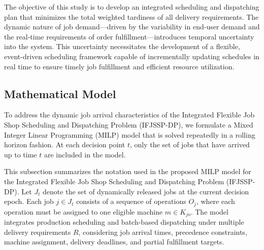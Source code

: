 \documentclass{article}
\begin{document}
The objective of this study is to develop an integrated scheduling and dispatching plan that minimizes the total weighted tardiness of all delivery requirements. The dynamic nature of job demand—driven by the variability in end-user demand and the real-time requirements of order fulfillment—introduces temporal uncertainty into the system. This uncertainty necessitates the development of a flexible, event-driven scheduling framework capable of incrementally updating schedules in real time to ensure timely job fulfillment and efficient resource utilization.


\subsection{Mathematical Model}
To address the dynamic job arrival characteristics of the Integrated Flexible Job Shop Scheduling and Dispatching Problem (IFJSSP-DP), we formulate a Mixed Integer Linear Programming (MILP) model that is solved repeatedly in a rolling horizon fashion. At each decision point \( t \), only the set of jobs that have arrived up to time \( t \) are included in the model.

This subsection summarizes the notation used in the proposed MILP model for the Integrated Flexible Job Shop Scheduling and Dispatching Problem (IFJSSP-DP). Let \( J_t \) denote the set of dynamically released jobs at the current decision epoch. Each job \( j \in J_t \) consists of a sequence of operations \( O_j \), where each operation must be assigned to one eligible machine \( m \in K_{jo} \). The model integrates production scheduling and batch-based dispatching under multiple delivery requirements \( R \), considering job arrival times, precedence constraints, machine assignment, delivery deadlines, and partial fulfillment targets.
\end{document}
